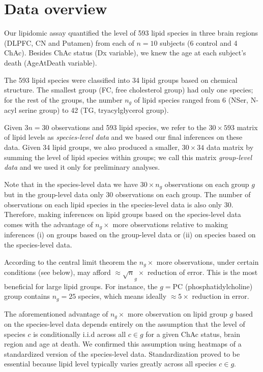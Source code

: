 \documentclass[letterpaper]{article}
\begin{document}
\section{Data overview}

Our lipidomic assay quantified the level of 593 lipid species in three brain
regions (DLPFC, CN and Putamen) from each of $n=10$ subjects (6 control and 4
ChAc).  Besides ChAc status (Dx variable), we knew the age at each subject's
death (AgeAtDeath variable).

The 593 lipid species were classified into 34 lipid groups based on chemical
structure.  The smallest group (FC, free cholesterol group) had only one
species; for the rest of the groups, the number $n_g$ of lipid species ranged
from 6 (NSer, N-acyl serine group) to 42 (TG, tryacylglycerol group).

Given $3n = 30$ observations and 593 lipid species, we refer to the $30 \times
593$ matrix of lipid levels as \emph{species-level data} and we based our
final inferences on these data.  Given 34 lipid groups, we also produced a
smaller, $30 \times 34$ data matrix by summing the level of lipid species
within groups; we call this matrix \emph{group-level data} and we used it only
for preliminary analyses.

Note that in the species-level data we have $30 \times n_g$ observations on
each group $g$ but in the group-level data only $30$ observations on each
group.  The number of observations on each lipid species in the species-level
data is also only $30$.  Therefore, making inferences on lipid groups based on
the species-level data comes with the advantage of $n_g \times$ more
observations relative to making inferences (i) on groups based on the
group-level data or (ii) on species based on the species-level data.

According to the central limit theorem the $n_g \times$ more observations,
under certain conditions (see below), may afford $\approx \sqrt n_g \times$
reduction of error.  This is the most beneficial for large lipid groups.  For
instance, the $g = \mathrm{PC}$ (phosphatidylcholine) group contains $n_g =
25$ species, which means ideally $\approx 5 \times$ reduction in error.

The aforementioned advantage of $n_g \times$
more observation on lipid group $g$ based on the species-level data depends
entirely on the assumption that the level of species $c$ is conditionally
i.i.d across all $c \in g$ for a given ChAc status, brain region and age at
death.  We confirmed this assumption using heatmaps of a standardized  version
of the species-level data.  Standardization proved to be essential because
lipid level typically varies greatly across all species $c \in g$.
\end{document}
